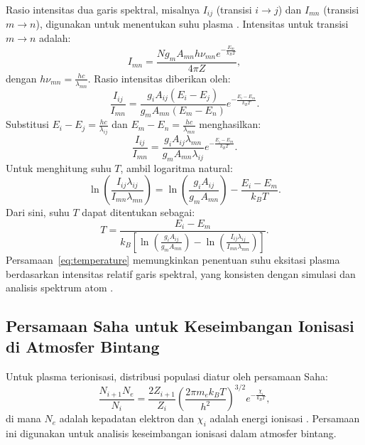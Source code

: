 Rasio intensitas dua garis spektral, misalnya \( I_{ij} \) (transisi \( i \to j \)) dan \( I_{mn} \) (transisi \( m \to n \)), digunakan untuk menentukan suhu plasma \citep{Mason2015}. Intensitas untuk transisi \( m \to n \) adalah:
\begin{equation}
I_{mn} = \frac{N g_m A_{mn} h \nu_{mn} e^{-\frac{E_m}{k_B T}}}{4\pi Z}, \label{eq:intensity_mn}
\end{equation}
dengan \( h \nu_{mn} = \frac{h c}{\lambda_{mn}} \). Rasio intensitas diberikan oleh:
\begin{equation}
\frac{I_{ij}}{I_{mn}} = \frac{g_i A_{ij} (E_i - E_j)}{g_m A_{mn} (E_m - E_n)} e^{-\frac{E_i - E_m}{k_B T}}. \label{eq:intensity_ratio}
\end{equation}
Substitusi \( E_i - E_j = \frac{h c}{\lambda_{ij}} \) dan \( E_m - E_n = \frac{h c}{\lambda_{mn}} \) menghasilkan:
\begin{equation}
\frac{I_{ij}}{I_{mn}} = \frac{g_i A_{ij} \lambda_{mn}}{g_m A_{mn} \lambda_{ij}} e^{-\frac{E_i - E_m}{k_B T}}. \label{eq:intensity_ratio_lambda}
\end{equation}
Untuk menghitung suhu \( T \), ambil logaritma natural:
\begin{equation}
\ln \left( \frac{I_{ij} \lambda_{ij}}{I_{mn} \lambda_{mn}} \right) = \ln \left( \frac{g_i A_{ij}}{g_m A_{mn}} \right) - \frac{E_i - E_m}{k_B T}. \label{eq:ln_ratio}
\end{equation}
Dari sini, suhu \( T \) dapat ditentukan sebagai:
\begin{equation}
T = \frac{E_i - E_m}{k_B \left[ \ln \left( \frac{g_i A_{ij}}{g_m A_{mn}} \right) - \ln \left( \frac{I_{ij} \lambda_{ij}}{I_{mn} \lambda_{mn}} \right) \right]}. \label{eq:temperature}
\end{equation}
Persamaan~\eqref{eq:temperature} memungkinkan penentuan suhu eksitasi plasma berdasarkan intensitas relatif garis spektral, yang konsisten dengan simulasi dan analisis spektrum atom \citep{rybicki-1985,Draine2011,Mason2015}.
\subsection{Persamaan Saha untuk Keseimbangan Ionisasi di Atmosfer Bintang}
Untuk plasma terionisasi, distribusi populasi diatur oleh persamaan Saha:
\begin{equation}
\frac{N_{i+1} N_e}{N_i} = \frac{2 Z_{i+1}}{Z_i} \left( \frac{2\pi m_e k_B T}{h^2} \right)^{3/2} e^{-\frac{\chi_i}{k_B T}},
\end{equation}
di mana $N_e$ adalah kepadatan elektron dan $\chi_i$ adalah energi ionisasi \citep{Pathria2011}. Persamaan ini digunakan untuk analisis keseimbangan ionisasi dalam atmosfer bintang.

